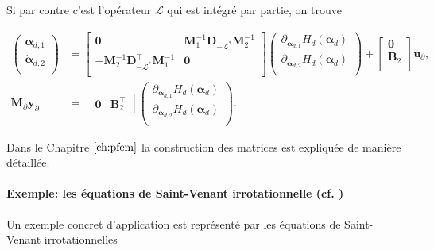Si par contre c'est l'opérateur $\mathcal{L}$ qui est intégré par partie, on trouve

\begin{equation*}
\begin{aligned}
\begin{pmatrix}
\dot{\bm{\alpha}}_{d, 1} \\
\dot{\bm{\alpha}}_{d, 2} \\
\end{pmatrix}
&= \begin{bmatrix}
\mathbf{0} & \mathbf{M}_1^{-1} \mathbf{D}_{-\mathcal{L}^*} \mathbf{M}_2^{-1}\\
-\mathbf{M}_2^{-1} \mathbf{D}_{-\mathcal{L}^*}^\top \mathbf{M}_1^{-1} & \mathbf{0} \\
\end{bmatrix} 
\begin{pmatrix}
\partial_{\bm{\alpha}_{d, 1}} H_d(\bm{\alpha}_d)\\
\partial_{\bm{\alpha}_{d, 2}} H_d(\bm{\alpha}_d)\\
\end{pmatrix} + 
\begin{bmatrix}
\mathbf{0}\\
\mathbf{B}_2\\
\end{bmatrix}
\mathbf{u}_\partial, \\
\mathbf{M}_\partial {\mathbf{y}_\partial} &= 
\begin{bmatrix}
\mathbf{0} & \mathbf{B}_2^\top 
\end{bmatrix}\begin{pmatrix}
\partial_{\bm{\alpha}_{d, 1}} H_d(\bm{\alpha}_d)\\
\partial_{\bm{\alpha}_{d, 2}} H_d(\bm{\alpha}_d)\\
\end{pmatrix}.
\end{aligned}
\end{equation*}

Dans le Chapitre $\ref{ch:pfem}$ la construction des matrices est expliquée de manière détaillée.

\paragraph{Exemple: les équations de Saint-Venant irrotationnelle (cf. )}
Un exemple concret d'application est représenté par les équations de Saint-Venant irrotationnelles 

